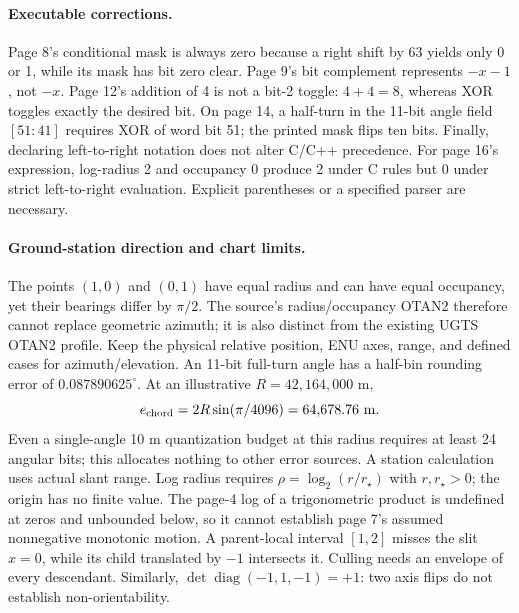 \begin{samepage}
\paragraph{Executable corrections.}
Page 8's conditional mask is always zero because a right shift by 63 yields
only 0 or 1, while its mask has bit zero clear. Page 9's bit complement
represents $-x-1$, not $-x$. Page 12's addition of 4 is not a bit-2 toggle:
$4+4=8$, whereas XOR toggles exactly the desired bit. On page 14, a half-turn
in the 11-bit angle field $[51:41]$ requires XOR of word bit 51; the printed
mask flips ten bits. Finally, declaring left-to-right notation does not alter
C/C++ precedence. For page 16's expression, log-radius 2 and occupancy 0
produce 2 under C rules but 0 under strict left-to-right evaluation. Explicit
parentheses or a specified parser are necessary.
\par\end{samepage}

\paragraph{Ground-station direction and chart limits.}
The points $(1,0)$ and $(0,1)$ have equal radius and can have equal occupancy,
yet their bearings differ by $\pi/2$. The source's radius/occupancy OTAN2
therefore cannot replace geometric azimuth; it is also distinct from the
existing UGTS OTAN2 profile. Keep the physical relative position, ENU axes,
range, and defined cases for azimuth/elevation.
An 11-bit full-turn angle has a half-bin rounding error of
$0.087890625^\circ$. At an illustrative $R=42{,}164{,}000$ m,
\[
e_{\rm chord}=2R\sin(\pi/4096)=64{,}678.76\ \mathrm m.
\]
Even a single-angle 10 m quantization budget at this radius requires at least
24 angular bits; this allocates nothing to other error sources. A station
calculation uses actual slant range. Log radius requires
$\rho=\log_2(r/r_\star)$ with $r,r_\star>0$; the origin has no finite value.
The page-4 log of a trigonometric product is undefined at zeros and unbounded
below, so it cannot establish page 7's assumed nonnegative monotonic motion.
A parent-local interval $[1,2]$ misses the slit $x=0$, while its child translated
by $-1$ intersects it. Culling needs an envelope of every descendant.
Similarly, $\det\operatorname{diag}(-1,1,-1)=+1$: two axis flips do not
establish non-orientability.

